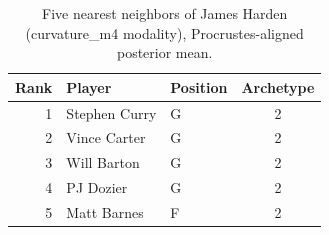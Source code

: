 \begin{table}[htbp]
  \centering\small
  \begin{tabular}{rllc}
    \toprule
    Rank & Player & Position & Archetype \\
    \midrule
    1 & Stephen Curry & G & 2 \\
    2 & Vince Carter & G & 2 \\
    3 & Will Barton & G & 2 \\
    4 & PJ Dozier & G & 2 \\
    5 & Matt Barnes & F & 2 \\
    \bottomrule
  \end{tabular}
  \caption{Five nearest neighbors of James Harden (curvature_m4 modality), Procrustes-aligned posterior mean.}
  \label{tab:James_Harden_neighbors_curvature_m4}
\end{table}

